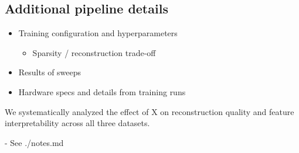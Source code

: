 \subsection{Additional pipeline details}
\label{subsection:additional_pipeline_details}

\begin{itemize}
    \item Training configuration and hyperparameters
    \begin{itemize}
        \item Sparsity / reconstruction trade-off
    \end{itemize}
    \item Results of sweeps
    \item Hardware specs and details from training runs
\end{itemize}

We systematically analyzed the effect of X on reconstruction quality and feature interpretability across all three datasets.

- See ./notes.md
